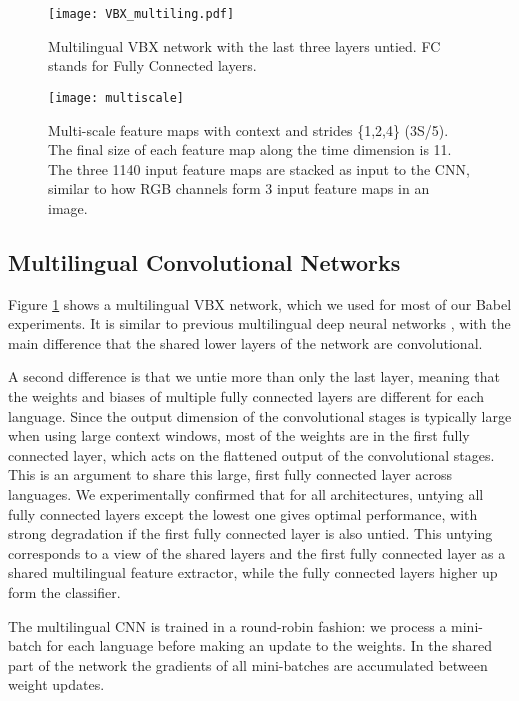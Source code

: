\documentclass{article}
\begin{document}
\begin{figure}[htp]
    \centering
    \texttt{[image: VBX\_multiling.pdf]}
    \caption{Multilingual VBX network with the last three layers untied. FC stands for Fully Connected layers.}
    \label{fig:multiling}
\end{figure}

\label{ssec:MS}
\begin{figure}[htp]
    \centering
    \texttt{[image: multiscale]}
    \caption{Multi-scale feature maps with context  and strides \{1,2,4\} (3S/5).
        The final size of each feature map along the time dimension is 11.
    The three 1140 input feature maps are stacked as input to the CNN, similar to how RGB channels form 
    3 input feature maps in an image.}
    \label{fig:MS_image}
\end{figure}
\subsection{Multilingual Convolutional Networks}
\label{ssec:ML}

Figure \ref{fig:multiling} shows a multilingual VBX network, which we used for
most of our Babel experiments.
It is similar to previous multilingual deep neural networks \cite{scanzio2008use}, 
with the main difference that the shared lower layers of the network are convolutional.

A second difference is that we untie more than only the last layer,
meaning that the weights and biases of multiple fully connected layers are
different for each language.
Since the output dimension of the convolutional stages is typically large when using 
large context windows, most of the weights are
in the first fully connected layer, which acts on the flattened output of the convolutional stages.
This is an argument to share this large, first fully connected layer across languages.
We experimentally confirmed that for all architectures,
untying all fully connected layers except the lowest one gives optimal performance,
with strong degradation if the first fully connected layer is also untied.
This untying corresponds to a view of the shared layers and the first fully connected layer as a shared
multilingual feature extractor, while the fully connected layers higher up form the classifier.

The multilingual CNN is trained in a round-robin fashion:
we process a mini-batch for each language before making an update to the weights.
In the shared part of the network the gradients of all mini-batches are accumulated between weight updates.
\end{document}

